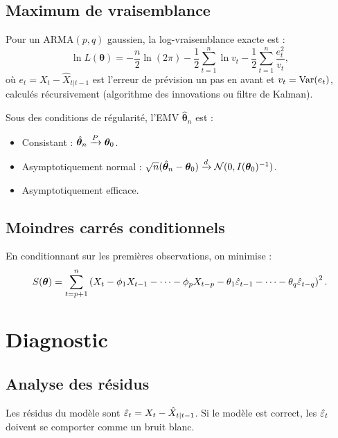 \subsection{Maximum de vraisemblance}

\begin{definition}
Pour un ARMA$(p,q)$ gaussien, la log-vraisemblance exacte est :
\[
\ln L(\bm\theta) = -\frac{n}{2}\ln(2\pi) - \frac{1}{2}\sum_{t=1}^n\ln v_t - \frac{1}{2}\sum_{t=1}^n\frac{e_t^2}{v_t},
\]
o\`u $e_t = X_t - \hat{X}_{t|t-1}$ est l'erreur de pr\'evision un pas en avant et $v_t=\operatorname{Var}(e_t)$, calcul\'es r\'ecursivement (algorithme des innovations ou filtre de Kalman).
\end{definition}

\begin{theoreme}
Sous des conditions de r\'egularit\'e, l'EMV $\hat{\bm\theta}_n$ est :
\begin{itemize}
\item Consistant : $\hat{\bm\theta}_n\xrightarrow{P}\bm\theta_0$.
\item Asymptotiquement normal : $\sqrt{n}(\hat{\bm\theta}_n-\bm\theta_0)\xrightarrow{d}\mathcal{N}(0,I(\bm\theta_0)^{-1})$.
\item Asymptotiquement efficace.
\end{itemize}
\end{theoreme}

\subsection{Moindres carr\'es conditionnels}

\begin{definition}
En conditionnant sur les premi\`eres observations, on minimise :
\[
S(\bm\theta) = \sum_{t=p+1}^n\left(X_t - \phi_1 X_{t-1}-\cdots - \phi_p X_{t-p} - \theta_1\hat{\varepsilon}_{t-1}-\cdots-\theta_q\hat{\varepsilon}_{t-q}\right)^2.
\]
\end{definition}

\section{Diagnostic}

\subsection{Analyse des r\'esidus}

\begin{definition}
Les r\'esidus du mod\`ele sont $\hat{\varepsilon}_t = X_t - \hat{X}_{t|t-1}$. Si le mod\`ele est correct, les $\hat{\varepsilon}_t$ doivent se comporter comme un bruit blanc.
\end{definition}

